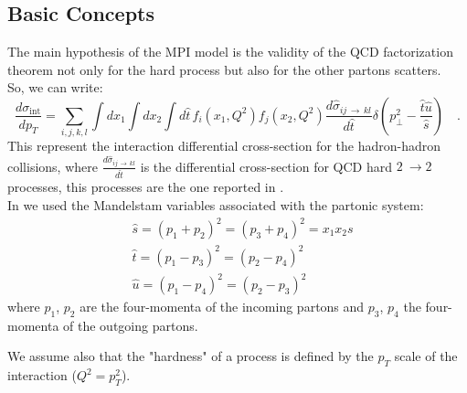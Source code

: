 \subsection{Basic Concepts}
\label{sec:BasicConcepts}

The main hypothesis of the MPI model is the validity of the QCD factorization theorem not only for the hard process but also for the other partons scatters.
\\
So, we can write:
\begin{equation}
	\frac{d\sigma_{\text{int}}}{dp_T}=\displaystyle\sum_{i,j,k,l}\displaystyle\int dx_1 \displaystyle\int dx_2 \displaystyle\int d\hat{t}\, f_i(x_1,Q^2)f_j(x_2,Q^2)\frac{d\hat{\sigma}_{ij\,\rightarrow\,kl}}{d\hat{t}}\delta\left( p_\perp^2-\frac{\hat{t}\hat{u}}{\hat{s}} \right) \quad .
	\label{eq:sigma_int1}
\end{equation}
This represent the interaction differential cross-section for the hadron-hadron collisions, where $\frac{d\hat{\sigma}_{ij\,\rightarrow\,kl}}{d\hat{t}}$ is the differential cross-section for QCD hard $2\ \rightarrow 2$ processes, this processes are the one reported in . 
\\
In  we used the Mandelstam variables associated with the partonic system:
\begin{align}
	&\hat{s}=(p_1+p_2)^2=(p_3+p_4)^2=x_1x_2s\\
	&\hat{t}=(p_1-p_3)^2=(p_2-p_4)^2\\
	&\hat{u}=(p_1-p_4)^2=(p_2-p_3)^2
\end{align} 
where $p_1$, $p_2$ are the four-momenta of the incoming partons and $p_3$, $p_4$ the four-momenta of the outgoing partons. 


\noindent We assume also that the "hardness" of a  process is defined by the $p_T$ scale of the interaction ($Q^2=p_T^2$).

